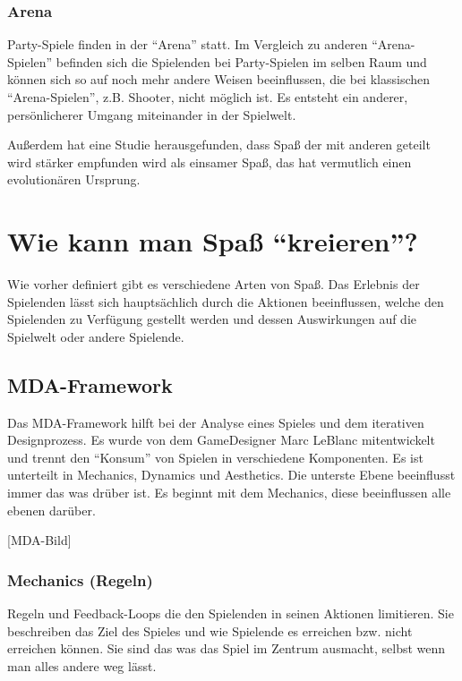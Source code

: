 \subsubsection{Arena}
Party-Spiele finden in der "`Arena"' statt\cite[S. 65]{_art_of_gamedesign}. Im Vergleich zu anderen "`Arena-Spielen"' befinden sich die Spielenden bei Party-Spielen im selben Raum und können sich so auf noch mehr andere Weisen beeinflussen, die bei klassischen "`Arena-Spielen"', z.B. Shooter, nicht möglich ist. Es entsteht ein anderer, persönlicherer Umgang miteinander in der Spielwelt.\newline

\noindent Außerdem hat eine Studie herausgefunden, dass Spaß der mit anderen geteilt wird stärker empfunden wird als einsamer Spaß, das hat vermutlich einen evolutionären Ursprung\cite{_fun_is_more_fun}.

\section{Wie kann man Spaß "`kreieren"'?}

Wie vorher definiert gibt es verschiedene Arten von Spaß. Das Erlebnis der Spielenden lässt sich hauptsächlich durch die Aktionen beeinflussen, welche den Spielenden zu Verfügung gestellt werden und dessen Auswirkungen auf die Spielwelt oder andere Spielende.

\subsection{MDA-Framework}

Das MDA-Framework hilft bei der Analyse eines Spieles und dem iterativen Designprozess. Es wurde von dem GameDesigner Marc LeBlanc mitentwickelt und trennt den "`Konsum"' von Spielen in verschiedene Komponenten\cite{_mda}. Es ist unterteilt in Mechanics, Dynamics und Aesthetics. Die unterste Ebene beeinflusst immer das was drüber ist. Es beginnt mit dem Mechanics, diese beeinflussen alle ebenen darüber.

[MDA-Bild]

\subsubsection{Mechanics (Regeln)}

Regeln und Feedback-Loops die den Spielenden in seinen Aktionen limitieren. Sie beschreiben das Ziel des Spieles und wie Spielende es erreichen bzw. nicht erreichen können\cite[S.96]{_art_of_gamedesign}. Sie sind das was das Spiel im Zentrum ausmacht, selbst wenn man alles andere weg lässt. \cite[S.231]{_art_of_gamedesign}
 

